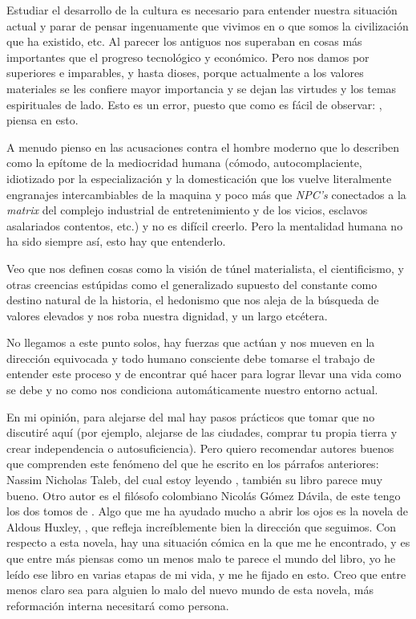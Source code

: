 \documentclass[12pt]{article}
\begin{document}
	Estudiar el desarrollo de la cultura es necesario para entender nuestra
	situación actual y parar de pensar ingenuamente que vivimos en
	 o que somos la civilización
	 que ha existido, etc. Al parecer los antiguos
	nos superaban en cosas más importantes que el progreso tecnológico y
	económico. Pero nos damos por superiores e imparables, y hasta dioses,
	porque actualmente a los valores materiales se les confiere mayor
	importancia y se dejan las virtudes y los temas espirituales de lado.
	Esto es un error, puesto que como es fácil de observar: , piensa en esto.

	A menudo pienso en las acusaciones contra el hombre moderno que lo
	describen como la epítome de la mediocridad humana (cómodo,
	autocomplaciente, idiotizado por la especialización y la domesticación 
	que los vuelve literalmente engranajes intercambiables de la maquina y
	poco más que \textit{NPC's} conectados a la \textit{matrix} del complejo
	industrial de entretenimiento y de los vicios, esclavos asalariados
	contentos, etc.) y no es difícil creerlo. Pero la mentalidad humana no
	ha sido siempre así, esto hay que entenderlo.

	Veo que nos definen cosas como la visión de túnel materialista, el
	cientificismo, y otras creencias estúpidas como el generalizado supuesto
	del  constante como destino natural de la historia,
	el hedonismo que nos aleja de la búsqueda de valores elevados y nos roba
	nuestra dignidad, y un largo etcétera.

	No llegamos a este punto solos, hay fuerzas que actúan y nos mueven en
	la dirección equivocada y todo humano consciente debe tomarse el trabajo
	de entender este proceso y de encontrar qué hacer para lograr llevar una
	vida como se debe y no como nos condiciona automáticamente nuestro
	entorno actual.

	En mi opinión, para alejarse del mal hay pasos prácticos que tomar que
	no discutiré aquí (por ejemplo, alejarse de las ciudades, comprar tu
	propia tierra y crear independencia o autosuficiencia). Pero quiero
	recomendar autores buenos que comprenden este fenómeno del que he
	escrito en los párrafos anteriores: Nassim Nicholas Taleb, del cual
	estoy leyendo , también su libro
	 parece muy bueno. Otro autor es el filósofo
	colombiano Nicolás Gómez Dávila, de este tengo los dos tomos de
	. Algo que me ha ayudado
	mucho a abrir los ojos es la novela de Aldous Huxley,
	, que refleja increíblemente bien la dirección
	que seguimos. Con respecto a esta novela, hay una situación cómica en la
	que me he encontrado, y es que entre más piensas como un
	 menos malo te parece el mundo del libro, yo he leído
	ese libro en varias etapas de mi vida, y me he fijado en esto. Creo que
	entre menos claro sea para alguien lo malo del nuevo mundo de esta
	novela, más reformación interna necesitará como persona.
\end{document}
